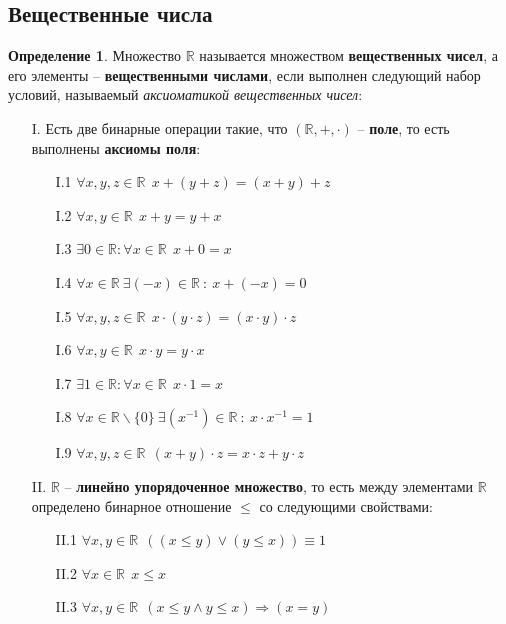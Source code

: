 \documentclass[14pt, a4paper]{article}
\theoremstyle{definition}
\newtheorem{definition}{Определение}[section]
\theoremstyle{remark}
\begin{document}
\subsection{Вещественные числа}
\begin{definition}
    Множество $\mathbb{R}$ называется множеством \textbf{вещественных чисел}, а его элементы -- \textbf{вещественными числами}, если выполнен следующий набор условий,
    называемый \textit{аксиоматикой вещественных чисел}:
\begin{itemize}
    \item[I.] Есть две бинарные операции такие, что $(\mathbb{R}, +, \cdot)$ -- \textbf{поле}, то есть выполнены \textbf{аксиомы поля}:
    \begin{itemize}
        \item[I.1] $\forall x,y,z \in \mathbb{R} \ \ x + (y + z) = (x + y) + z$
        \item[I.2] $\forall x,y \in \mathbb{R} \ \ x + y = y + x$
        \item[I.3] $\exists 0 \in \mathbb{R} : \forall x \in \mathbb{R} \ \ x + 0 = x$
        \item[I.4] $\forall x \in \mathbb{R} \ \exists (-x) \in \mathbb{R} \ : \ x + (-x) = 0$
        \item[I.5] $\forall x,y,z \in \mathbb{R} \ \ x \cdot (y \cdot z) = (x \cdot y) \cdot z$
        \item[I.6] $\forall x,y \in \mathbb{R} \ \ x \cdot y = y \cdot x$
        \item[I.7] $\exists 1 \in \mathbb{R} : \forall x \in \mathbb{R} \ \ x \cdot 1 = x$
        \item[I.8] $\forall x \in \mathbb{R} \backslash \{0\} \ \exists (x^{-1}) \in \mathbb{R} \ : \ x \cdot x^{-1} = 1$
        \item[I.9] $\forall x,y,z \in \mathbb{R} \ \ (x + y) \cdot z = x \cdot z + y \cdot z $
    \end{itemize}
    \item[II.] $\mathbb{R}$ -- \textbf{линейно упорядоченное множество}, то есть между элементами $\mathbb{R}$ определено бинарное отношение $\leq$ со следующими свойствами:
    \begin{itemize}
        \item[II.1] $\forall x,y \in \mathbb{R} \ \ ((x \leq y) \vee (y \leq x)) \equiv 1$
        \item[II.2] $\forall x \in \mathbb{R} \ \ x \leq x$
        \item[II.3] $\forall x, y \in \mathbb{R} \ \ (x \leq y \wedge  y \leq x) \Rightarrow (x = y)$

\end{itemize}
\end{itemize}
\end{definition}
\end{document}
